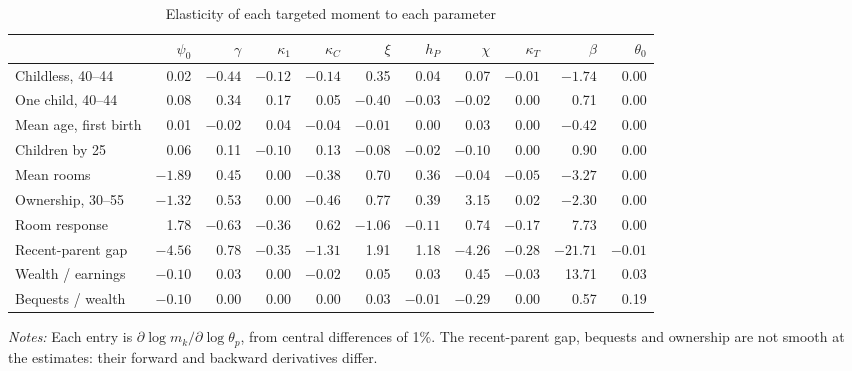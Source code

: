 \begin{table}[ht]
\centering
\caption{Elasticity of each targeted moment to each parameter}
\label{tab:app-jacobian}
\footnotesize
\setlength{\tabcolsep}{4pt}
\begin{tabular}{@{}l rrrrrrrrrr@{}}
\toprule
 & $\psi_0$ & $\gamma$ & $\kappa_1$ & $\kappa_C$ & $\xi$ & $h_P$ & $\chi$ & $\kappa_T$ & $\beta$ & $\theta_0$ \\
\midrule
Childless, 40--44 & 0.02 & $-0.44$ & $-0.12$ & $-0.14$ & 0.35 & 0.04 & 0.07 & $-0.01$ & $-1.74$ & 0.00 \\
One child, 40--44 & 0.08 & 0.34 & 0.17 & 0.05 & $-0.40$ & $-0.03$ & $-0.02$ & 0.00 & 0.71 & 0.00 \\
Mean age, first birth & 0.01 & $-0.02$ & 0.04 & $-0.04$ & $-0.01$ & 0.00 & 0.03 & 0.00 & $-0.42$ & 0.00 \\
Children by 25 & 0.06 & 0.11 & $-0.10$ & 0.13 & $-0.08$ & $-0.02$ & $-0.10$ & 0.00 & 0.90 & 0.00 \\
Mean rooms & $-1.89$ & 0.45 & 0.00 & $-0.38$ & 0.70 & 0.36 & $-0.04$ & $-0.05$ & $-3.27$ & 0.00 \\
Ownership, 30--55 & $-1.32$ & 0.53 & 0.00 & $-0.46$ & 0.77 & 0.39 & 3.15 & 0.02 & $-2.30$ & 0.00 \\
Room response & 1.78 & $-0.63$ & $-0.36$ & 0.62 & $-1.06$ & $-0.11$ & 0.74 & $-0.17$ & 7.73 & 0.00 \\
Recent-parent gap & $-4.56$ & 0.78 & $-0.35$ & $-1.31$ & 1.91 & 1.18 & $-4.26$ & $-0.28$ & $-21.71$ & $-0.01$ \\
Wealth / earnings & $-0.10$ & 0.03 & 0.00 & $-0.02$ & 0.05 & 0.03 & 0.45 & $-0.03$ & 13.71 & 0.03 \\
Bequests / wealth & $-0.10$ & 0.00 & 0.00 & 0.00 & 0.03 & $-0.01$ & $-0.29$ & 0.00 & 0.57 & 0.19 \\
\bottomrule
\end{tabular}
\par\smallskip
\begin{minipage}{0.95\linewidth}
\footnotesize\textit{Notes:} Each entry is $\partial\log m_k/\partial\log
\theta_p$, from central differences of 1\%. The recent-parent gap, bequests
and ownership are not smooth at the estimates: their forward and backward
derivatives differ. 
\end{minipage}
\end{table}

